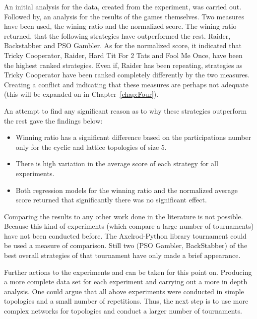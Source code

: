 An initial analysis for the data, created from the experiment, was carried out.
Followed by, an analysis for the results of the games themselves.
Two measures have been used, the wining ratio and the normalized score. The
wining ratio returned, that the following strategies have outperformed the rest.
Raider, Backstabber and PSO Gambler. As for the normalized score, it indicated
that Tricky Cooperator,  Raider, Hard Tit For 2 Tats and Fool Me Once, have been the
highest ranked strategies. Even if, Raider has been repeating, strategies as
Tricky Cooperator have been ranked completely differently by the two measures.
Creating a conflict and indicating that these measures are perhaps not adequate
(this will be expanded on in Chapter~\ref{chap:Four}).

An attempt to find any significant reason as to why these strategies outperform
the rest gave the findings below:

\begin{itemize}
	\item Winning ratio has a significant difference based on the participations
	      number only for the cyclic and lattice topologies of size 5.
	\item There is high variation in the average score of each strategy for all
	      experiments.
	\item Both regression models for the winning ratio and the normalized average
	      score returned that significantly there was no significant effect.
\end{itemize}

Comparing the results to any other work done in the literature is not possible.
Because this kind of experiments (which compare a large number of tournaments)
have not been conducted before.
The Axelrod-Python library tournament could be used  a measure of comparison.
Still two (PSO Gambler, BackStabber) of the best overall strategies of that
tournament have only made a brief appearance.

Further actions to the experiments and can be taken for this point on.
Producing a more complete data set for each experiment and carrying out a more
in depth analysis. One could argue that all above experiments
were conducted in simple topologies and a small number of repetitions. Thus, the
next step is to use more complex networks for topologies and conduct a larger
number of tournaments.

